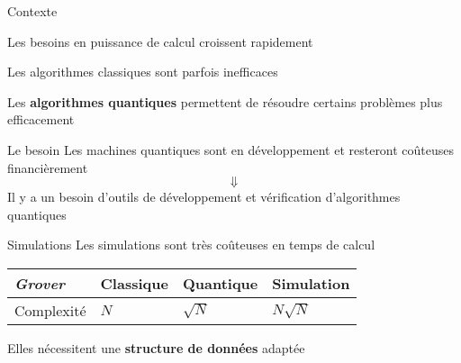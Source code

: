 \begin{frame}{Contexte}

\begin{center}
  Les besoins en puissance de calcul croissent rapidement
  

  Les algorithmes classiques sont parfois inefficaces

  \pause
  Les \textbf{algorithmes quantiques} permettent de résoudre certains problèmes plus efficacement
  \end{center}
\end{frame}

\begin{frame}{Le besoin}
  Les machines quantiques sont en développement et resteront coûteuses financièrement
  $$\Downarrow$$
  Il y a un besoin d'outils de développement et vérification d'algorithmes quantiques
\end{frame}

\begin{frame}{Simulations}
  Les simulations sont très coûteuses en temps de calcul
  \begin{table}[]
    \begin{tabular}{l|l|l|l}
        \textit{Grover} & Classique & Quantique & Simulation    \\ \hline \rule{0pt}{2.6ex}
    Complexité & $N$       & $\sqrt N$ & {\color{red}$N \sqrt N$}
    \end{tabular}
  \end{table}

  \vspace{1em}

  Elles nécessitent une \textbf{structure de données} adaptée
\end{frame}
